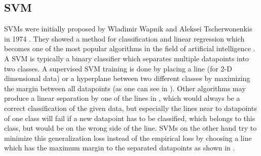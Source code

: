 \subsection{\acf{SVM}}
\label{sec:svm}

\acfp{SVM} were initially proposed by Wladimir Wapnik and Aleksei Tscherwonenkis in 1974 \cite{vapnik1974theory}. They showed a method for classification and linear regression which becomes one of the most popular algorithms in the field of artificial intelligence \cite{russellnorvig-ai}. A \ac{SVM} is typically a binary classifier which separates multiple datapoints into two classes. A supervised \ac{SVM} training is done by placing a line (for 2-D dimensional data) or a hyperplane between two different classes by maximizing the margin between all datapoints (as one can see in ). Other algorithms may produce a linear separation by one of the lines in , which would always be a correct classification of the given data, but especially the lines near to datapoints of one class will fail if a new datapoint has to be classified, which belongs to this class, but would be on the wrong side of the line. \acp{SVM} on the other hand try to minimize this generalization loss instead of the empirical loss by choosing a line which has the maximum margin to the separated datapoints as shown in .

